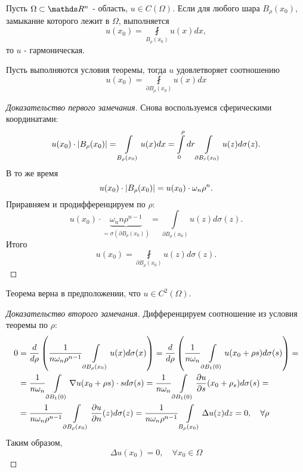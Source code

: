 \begin{theorem}
Пусть $\Omega \subset \real^n$ - область, $u \in C(\Omega)$. Если для любого шара $B_\rho (x_0)$, замыкание которого лежит в $\Omega$, выполняется
$$ u(x_0) = \fint \limits_{B_\rho(x_0)} u(x) dx,$$
то $u$ - гармоническая. 
\end{theorem}
\begin{note}
Пусть выполняются условия теоремы, тогда $u$ удовлетворяет соотношению
$$ u(x_0) = \fint \limits_{\partial B_\rho(x_0)} u(x) dx$$
\end{note}
\begin{proof}[Доказательство первого замечания]
Снова воспользуемся сферическими координатами:
$$u(x_0) \cdot \abs{B_\rho (x_0)} = \int \limits_{B_\rho (x_0)} u(x) dx = \int \limits_0^\rho dr \int \limits_{\partial B_r (x_0)} u(z) d \sigma(z).$$
В то же время
$$ u(x_0) \cdot \abs{B_\rho (x_0)} = u(x_0) \cdot \omega_n \rho^n.$$
Приравняем и продифференцируем по $\rho$:
$$ u(x_0) \cdot \underbrace {\omega_n n \rho^{n-1}}_{= \sigma(\partial B_\rho (x_0))} = \int \limits_{\partial B_\rho (x_0)} u(z) d\sigma(z).$$
Итого
$$ u(x_0) = \fint \limits_{\partial B_\rho (x_0)} u(z) d\sigma(z).$$

\end{proof}

\begin{note}
Теорема верна в предположении, что $u \in C^2 (\Omega)$.
\end{note}
\begin{proof}[Доказательство второго замечания]
Дифференцируем соотношение из условия теоремы по $\rho$:
\begin{align*}
0 &= \frac {d} {d\rho} \left( \frac {1} {n \omega_n \rho^{n-1}} \int \limits_{\partial B_\rho (x_0)} u(x) d\sigma(x) \right) = 
 \frac {d} {d\rho} \left( \frac {1} {n \omega_n} \int \limits_{\partial B_1(0)} u(x_0 + \rho s) d\sigma(s) \right) = \\
&= \frac {1} {n \omega_n} \int \limits_{\partial B_1 (0)} \nabla u(x_0 + \rho s) \cdot s d\sigma(s) = 
 \frac {1} {n \omega_n} \int \limits_{\partial B_1 (0)} \pder[u]{s}(x_0 +\rho_s) d\sigma(s) = \\
&= \frac {1} {n \omega_n \rho^{n-1}} \int \limits_{\partial B_\rho (x_0)} \pder[u]{n}(z) d\sigma(z) = 
 \frac {1} {n \omega_n \rho^{n-1}} \int \limits_{B_\rho (x_0)} \Delta u (z) dz = 0, \quad \forall \rho
\end{align*}
Таким образом,
$$\Delta u(x_0) = 0, \quad \forall x_0 \in \Omega$$

\end{proof}

